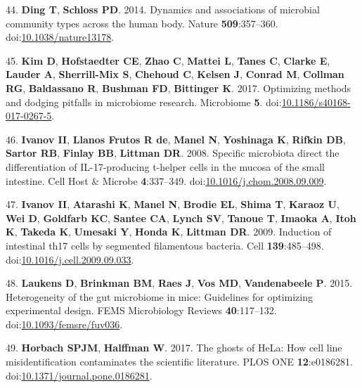 \documentclass[]{article}
\begin{document}
\hypertarget{ref-Ding2014}{}
44. \textbf{Ding T}, \textbf{Schloss PD}. 2014. Dynamics and
associations of microbial community types across the human body. Nature
\textbf{509}:357--360.
doi:\href{https://doi.org/10.1038/nature13178}{10.1038/nature13178}.

\hypertarget{ref-Kim2017}{}
45. \textbf{Kim D}, \textbf{Hofstaedter CE}, \textbf{Zhao C},
\textbf{Mattei L}, \textbf{Tanes C}, \textbf{Clarke E}, \textbf{Lauder
A}, \textbf{Sherrill-Mix S}, \textbf{Chehoud C}, \textbf{Kelsen J},
\textbf{Conrad M}, \textbf{Collman RG}, \textbf{Baldassano R},
\textbf{Bushman FD}, \textbf{Bittinger K}. 2017. Optimizing methods and
dodging pitfalls in microbiome research. Microbiome \textbf{5}.
doi:\href{https://doi.org/10.1186/s40168-017-0267-5}{10.1186/s40168-017-0267-5}.

\hypertarget{ref-Ivanov2008}{}
46. \textbf{Ivanov II}, \textbf{Llanos Frutos R de}, \textbf{Manel N},
\textbf{Yoshinaga K}, \textbf{Rifkin DB}, \textbf{Sartor RB},
\textbf{Finlay BB}, \textbf{Littman DR}. 2008. Specific microbiota
direct the differentiation of IL-17-producing t-helper cells in the
mucosa of the small intestine. Cell Host \& Microbe \textbf{4}:337--349.
doi:\href{https://doi.org/10.1016/j.chom.2008.09.009}{10.1016/j.chom.2008.09.009}.

\hypertarget{ref-Ivanov2009}{}
47. \textbf{Ivanov II}, \textbf{Atarashi K}, \textbf{Manel N},
\textbf{Brodie EL}, \textbf{Shima T}, \textbf{Karaoz U}, \textbf{Wei D},
\textbf{Goldfarb KC}, \textbf{Santee CA}, \textbf{Lynch SV},
\textbf{Tanoue T}, \textbf{Imaoka A}, \textbf{Itoh K}, \textbf{Takeda
K}, \textbf{Umesaki Y}, \textbf{Honda K}, \textbf{Littman DR}. 2009.
Induction of intestinal th17 cells by segmented filamentous bacteria.
Cell \textbf{139}:485--498.
doi:\href{https://doi.org/10.1016/j.cell.2009.09.033}{10.1016/j.cell.2009.09.033}.

\hypertarget{ref-Laukens2015}{}
48. \textbf{Laukens D}, \textbf{Brinkman BM}, \textbf{Raes J},
\textbf{Vos MD}, \textbf{Vandenabeele P}. 2015. Heterogeneity of the gut
microbiome in mice: Guidelines for optimizing experimental design. FEMS
Microbiology Reviews \textbf{40}:117--132.
doi:\href{https://doi.org/10.1093/femsre/fuv036}{10.1093/femsre/fuv036}.

\hypertarget{ref-Horbach2017}{}
49. \textbf{Horbach SPJM}, \textbf{Halffman W}. 2017. The ghosts of
HeLa: How cell line misidentification contaminates the scientific
literature. PLOS ONE \textbf{12}:e0186281.
doi:\href{https://doi.org/10.1371/journal.pone.0186281}{10.1371/journal.pone.0186281}.
\end{document}
